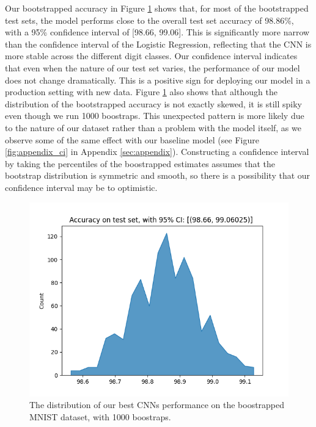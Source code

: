 \newpage
Our bootstrapped accuracy in Figure \ref{fig:cnn_conf} shows that, for most of the bootstrapped test sets, the model performs close to the overall test set accuracy of 98.86\%, with a 95\% confidence interval of [98.66, 99.06]. This is significantly more narrow than the confidence interval of the Logistic Regression, reflecting that the CNN is more stable across the different digit classes. Our confidence interval indicates that even when the nature of our test set varies, the performance of our model does not change dramatically. This is a positive sign for deploying our model in a production setting with new data. 
Figure \ref{fig:cnn_conf} also shows that although the distribution of the bootstrapped accuracy is not exactly skewed, it is still spiky even though we run 1000 boostraps. This unexpected pattern is more likely due to the nature of our dataset rather than a problem with the model itself, as we observe some of the same effect with our baseline model (see Figure \ref{fig:appendix_ci} in Appendix \ref{sec:appendix}). Constructing a confidence interval by taking the percentiles of the boostrapped estimates assumes that the bootstrap distribution is symmetric and smooth, so there is a possibility that our confidence interval may be to optimistic. \cite{davison1997bibliography}
\newline
\newline
\begin{figure}[H]
    \centering
    \includegraphics[width=\linewidth]{results/evaluation/cnn_confidence.png}
    \caption{The distribution of our best CNNs performance on the boostrapped MNIST dataset, with 1000 boostraps.}
    \label{fig:cnn_conf}
\end{figure}

